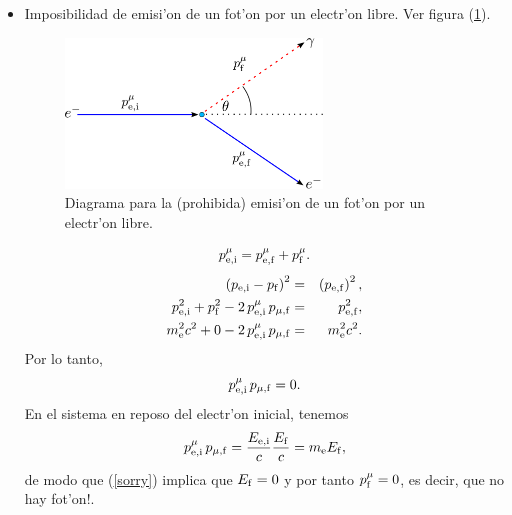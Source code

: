 \begin{itemize}
\item Imposibilidad de emisi'on de un fot'on por un electr'on libre. Ver figura (\ref{fig:no-emision}).
\begin{figure}[h!]
\centerline{\includegraphics[height=4cm]{fig/fig-no-emision.pdf}}
\caption{Diagrama para la (prohibida) emisi'on de un fot'on por un electr'on libre.}
\label{fig:no-emision}
\end{figure}

\begin{equation}
p^\mu_{\rm e,i}=p^\mu_{\rm e,f}+p^\mu_{\rm f}.
\end{equation}
\begin{eqnarray}
\left( p_{\rm e,i}-p_{\rm f}\right)^2 &=&\left( p_{\rm e,f}\right)^2 ,\\
p^2_{\rm e,i}+p^2_{\rm \rm f}-2\,p^\mu_{\rm e,i}\,p_{\mu, \rm f} &=& p^2_{\rm e,f} ,\\
m_{\rm e}^2 c^2+0-2\,p^\mu_{\rm e,i}\,p_{\mu, \rm f} &=& m_{\rm e}^2 c^2.
\end{eqnarray}
Por lo tanto,
\begin{equation}
p^\mu_{\rm e,i}\,p_{\mu, \rm f}=0.\label{sorry}
\end{equation}
En el sistema en reposo del electr'on inicial, tenemos
\begin{equation}
p^\mu_{\rm e,i}\,p_{\mu, \rm f}=\frac{E_{\rm e,i}}{c}\frac{E_{\rm f}}{c} =m_{\rm
e}E_{\rm f},
\end{equation}
de modo que (\ref{sorry}) implica que $E_{\rm f}=0$ y por tanto $p^\mu_{\rm
f}=0$, es decir, que no hay fot'on!.
\end{itemize}
